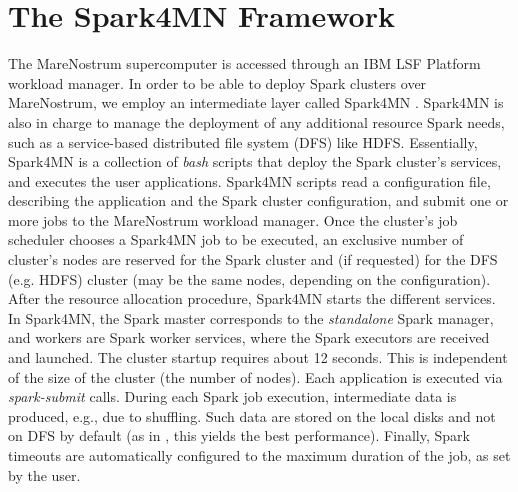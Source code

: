 \documentclass[journal]{IEEEtran}
\begin{document}


\section{The Spark4MN Framework}
\label{sec:spark4mn}
The MareNostrum supercomputer is accessed through an IBM LSF Platform workload manager. In order to be able to deploy Spark clusters over MareNostrum, we employ an intermediate layer called Spark4MN \cite{conf/bigdataconf/TousGournaris15}. Spark4MN is also in charge to manage the deployment of any additional resource Spark needs, such as a service-based distributed file system (DFS) like HDFS.
Essentially, Spark4MN is a collection of {\it bash} scripts that deploy the Spark
cluster's services, and executes the user applications. Spark4MN scripts read a configuration file, describing the application and the Spark cluster configuration, and submit one or more jobs to the MareNostrum workload manager. Once the cluster's job scheduler chooses a Spark4MN job to be executed, an exclusive number of cluster's nodes are reserved for the Spark cluster and (if requested) for the DFS (e.g. HDFS) cluster (may be the same nodes, depending on the configuration). After the resource allocation procedure, Spark4MN starts the different services. In Spark4MN, the Spark master corresponds to the \emph{standalone} Spark manager, and workers are Spark
worker services, where the Spark executors are received and launched. The cluster startup requires about 12 seconds. This is independent of the size of the cluster (the number of nodes). Each application is executed via {\it spark-submit} calls. During each Spark job execution, intermediate data is produced, e.g., due to shuffling. Such data are stored on the local disks and not on DFS by default (as in \cite{michael2014}, this yields the best performance). Finally, Spark timeouts are automatically configured to the maximum duration of the job, as set by the user.
\end{document}
